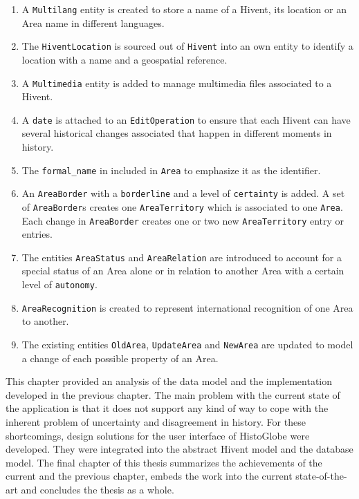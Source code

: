 \begin{enumerate}
  \item A \texttt{Multilang} entity is created to store a name of a Hivent, its location or an Area name in different languages.
  \item The \texttt{HiventLocation} is sourced out of \texttt{Hivent} into an own entity to identify a location with a name and a geospatial reference.
  \item A \texttt{Multimedia} entity is added to manage multimedia files associated to a Hivent.
  \item A \texttt{date} is attached to an \texttt{EditOperation} to ensure that each Hivent can have several historical changes associated that happen in different moments in history.
  \item The \texttt{formal\_name} in included in \texttt{Area} to emphasize it as the identifier.
  \item An \texttt{AreaBorder} with a \texttt{borderline} and a level of \texttt{certainty} is added. A set of \texttt{AreaBorder}s creates one \texttt{AreaTerritory} which is associated to one \texttt{Area}. Each change in \texttt{AreaBorder} creates one or two new \texttt{AreaTerritory} entry or entries.
  \item The entities \texttt{AreaStatus} and \texttt{AreaRelation} are introduced to account for a special status of an Area alone or in relation to another Area with a certain level of \texttt{autonomy}.
  \item \texttt{AreaRecognition} is created to represent international recognition of one Area to another.
  \item The existing entities \texttt{OldArea}, \texttt{UpdateArea} and \texttt{NewArea} are updated to model a change of each possible property of an Area.
\end{enumerate}





\vspace{2em}

This chapter provided an analysis of the data model and the implementation developed in the previous chapter. The main problem with the current state of the application is that it does not support any kind of way to cope with the inherent problem of uncertainty and disagreement in history. For these shortcomings, design solutions for the user interface of HistoGlobe were developed. They were integrated into the abstract Hivent model and the database model. The final chapter of this thesis summarizes the achievements of the current and the previous chapter, embeds the work into the current state-of-the-art and concludes the thesis as a whole.
